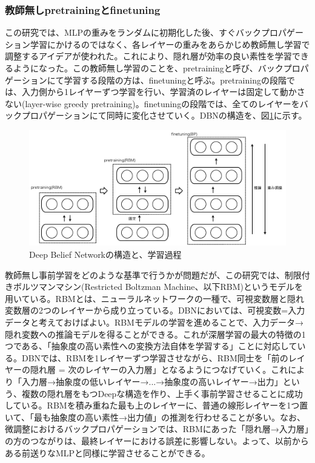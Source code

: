 \subsubsection{教師無しpretrainingとfinetuning}
この研究では、MLPの重みをランダムに初期化した後、すぐバックプロパゲーション学習にかけるのではなく、各レイヤーの重みをあらかじめ教師無し学習で調整するアイデアが使われた。これにより、隠れ層が効率の良い素性を学習できるようになった。この教師無し学習のことを、pretrainingと呼び、バックプロパゲーションにて学習する段階の方は、finetuningと呼ぶ。pretrainingの段階では、入力側から1レイヤーずつ学習を行い、学習済のレイヤーは固定して動かさない(layer-wise greedy pretraining)。finetuningの段階では、全てのレイヤーをバックプロパゲーションにて同時に変化させていく。DBNの構造を、図\ref{c3_dbn}に示す。\par
\begin{figure}[tbp]
 \centering
  \includegraphics[width=120mm]{img/c3/dbn}
 \caption{Deep Belief Networkの構造と、学習過程}
 \label{c3_dbn}
\end{figure}
教師無し事前学習をどのような基準で行うかが問題だが、この研究では、制限付きボルツマンマシン(Restricted Boltzman Machine、以下RBM)というモデルを用いている。RBMとは、ニューラルネットワークの一種で、可視変数層と隠れ変数層の2つのレイヤーから成り立っている。DBNにおいては、可視変数=入力データと考えておけばよい。RBMモデルの学習を進めることで、入力データ→隠れ変数への推論モデルを得ることができる。これが深層学習の最大の特徴の1つである、「抽象度の高い素性への変換方法自体を学習する」ことに対応している。DBNでは、RBMを1レイヤーずつ学習させながら、RBM同士を「前のレイヤーの隠れ層 = 次のレイヤーの入力層」となるようにつなげていく。これにより「入力層→抽象度の低いレイヤー→...→抽象度の高いレイヤー→出力」という、複数の隠れ層をもつDeepな構造を作り、上手く事前学習させることに成功している。RBMを積み重ねた最も上のレイヤーに、普通の線形レイヤーを1つ置いて、「最も抽象度の高い素性→出力値」の推測を行わせることが多い。なお、微調整におけるバックプロパゲーションでは、RBMにあった「隠れ層→入力層」の方のつながりは、最終レイヤーにおける誤差に影響しない。よって、以前からある前送りなMLPと同様に学習させることができる。
